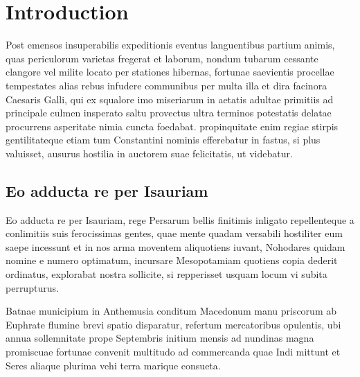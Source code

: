 \chapter{Introduction}
\label{sec:intro}

Post emensos insuperabilis expeditionis eventus languentibus partium
animis, quas periculorum varietas fregerat et laborum, nondum tubarum
cessante clangore vel milite locato per stationes hibernas, fortunae
saevientis procellae tempestates alias rebus infudere communibus per
multa illa et dira facinora Caesaris Galli, qui ex squalore imo
miseriarum in aetatis adultae primitiis ad principale culmen insperato
saltu provectus ultra terminos potestatis delatae procurrens
asperitate nimia cuncta foedabat. propinquitate enim regiae stirpis
gentilitateque etiam tum Constantini nominis efferebatur in fastus, si
plus valuisset, ausurus hostilia in auctorem suae felicitatis, ut
videbatur.

\section{Eo adducta re per Isauriam}
\label{sec:isauriam}

Eo adducta re per Isauriam, rege Persarum bellis finitimis inligato
repellenteque a conlimitiis suis ferocissimas gentes, quae mente
quadam versabili hostiliter eum saepe incessunt et in nos arma
moventem aliquotiens iuvant, Nohodares quidam nomine e numero
optimatum, incursare Mesopotamiam quotiens copia dederit ordinatus,
explorabat nostra sollicite, si repperisset usquam locum vi subita
perrupturus.

Batnae municipium in Anthemusia conditum Macedonum manu priscorum ab
Euphrate flumine brevi spatio disparatur, refertum mercatoribus
opulentis, ubi annua sollemnitate prope Septembris initium mensis ad
nundinas magna promiscuae fortunae convenit multitudo ad commercanda
quae Indi mittunt et Seres aliaque plurima vehi terra marique
consueta.

